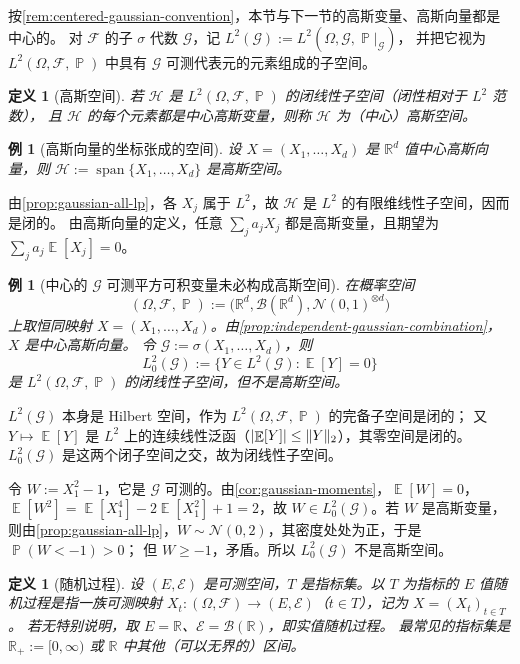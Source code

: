 \documentclass[UTF8,11pt,a4paper,oneside,fontset=fandol]{ctexrep}
\makeatletter
\numberwithin{equation}{section}
\theoremstyle{zhthm}
\newtheorem{definition}[theorem]{定义}
\newtheorem{example}[theorem]{例}
\renewenvironment{proof}[1][\proofname]{\par
  \pushQED{\qed}%
  \normalfont\topsep6\p@\@plus6\p@\relax
  \trivlist
  \item[\hskip\labelsep\bfseries#1\hspace{0.5em}]\ignorespaces
}{%
  \popQED\endtrivlist\@endpefalse
}
\renewcommand{\proofname}{证明}
\newcommand{\R}{\mathbb{R}}
\newcommand{\B}{\mathcal{B}}
\newcommand{\F}{\mathcal{F}}
\newcommand{\G}{\mathcal{G}}
\newcommand{\Hcal}{\mathcal{H}}
\DeclareMathOperator{\Prob}{\mathbb{P}}
\DeclareMathOperator{\E}{\mathbb{E}}
\DeclareMathOperator{\Span}{span}
\newcommand{\Normal}{\mathcal{N}}
\DeclarePairedDelimiter{\abs}{\lvert}{\rvert}
\DeclarePairedDelimiter{\norm}{\lVert}{\rVert}
\makeatother
\begin{document}
按\cref{rem:centered-gaussian-convention}，本节与下一节的高斯变量、高斯向量都是中心的。
对 $\F$ 的子 $\sigma$ 代数 $\G$，记 $L^2(\G):=L^2(\Omega,\G,\Prob|_{\G})$，
并把它视为 $L^2(\Omega,\F,\Prob)$ 中具有 $\G$ 可测代表元的元素组成的子空间。

\begin{definition}[高斯空间]
\label{def:gaussian-space}
若 $\Hcal$ 是 $L^2(\Omega,\F,\Prob)$ 的闭线性子空间（闭性相对于 $L^2$ 范数），
且 $\Hcal$ 的每个元素都是中心高斯变量，则称 $\Hcal$ 为（中心）高斯空间。
\end{definition}

\begin{example}[高斯向量的坐标张成的空间]
\label{ex:gaussian-coordinate-span}
设 $X=(X_1,\ldots,X_d)$ 是 $\R^d$ 值中心高斯向量，则 $\Hcal:=\Span\{X_1,\ldots,X_d\}$ 是高斯空间。
\end{example}

\begin{proof}
由\cref{prop:gaussian-all-lp}，各 $X_j$ 属于 $L^2$，故 $\Hcal$ 是 $L^2$ 的有限维线性子空间，因而是闭的。
由高斯向量的定义，任意 $\sum_ja_jX_j$ 都是高斯变量，且期望为 $\sum_ja_j\E[X_j]=0$。
\end{proof}

\begin{example}[中心的 $\G$ 可测平方可积变量未必构成高斯空间]
\label{ex:centered-measurable-not-gaussian-space}
在概率空间
\[
  (\Omega,\F,\Prob):=\bigl(\R^d,\B(\R^d),\Normal(0,1)^{\otimes d}\bigr)
\]
上取恒同映射 $X=(X_1,\ldots,X_d)$。由\cref{prop:independent-gaussian-combination}，$X$ 是中心高斯向量。
令 $\G:=\sigma(X_1,\ldots,X_d)$，则
\[
  L^2_0(\G):=\{Y\in L^2(\G):\E[Y]=0\}
\]
是 $L^2(\Omega,\F,\Prob)$ 的闭线性子空间，但不是高斯空间。
\end{example}

\begin{proof}
$L^2(\G)$ 本身是 Hilbert 空间，作为 $L^2(\Omega,\F,\Prob)$ 的完备子空间是闭的；
又 $Y\mapsto\E[Y]$ 是 $L^2$ 上的连续线性泛函（$\abs{\E[Y]}\le\norm{Y}_2$），其零空间是闭的。
$L^2_0(\G)$ 是这两个闭子空间之交，故为闭线性子空间。

令 $W:=X_1^2-1$，它是 $\G$ 可测的。由\cref{cor:gaussian-moments}，$\E[W]=0$，
$\E[W^2]=\E[X_1^4]-2\E[X_1^2]+1=2$，故 $W\in L^2_0(\G)$。若 $W$ 是高斯变量，
则由\cref{prop:gaussian-all-lp}，$W\sim\Normal(0,2)$，其密度处处为正，于是 $\Prob(W<-1)>0$；
但 $W\ge-1$，矛盾。所以 $L^2_0(\G)$ 不是高斯空间。
\end{proof}

\begin{definition}[随机过程]
\label{def:stochastic-process}
设 $(E,\mathcal{E})$ 是可测空间，$T$ 是指标集。以 $T$ 为指标的 $E$ 值随机过程是指一族可测映射
$X_t:(\Omega,\F)\to(E,\mathcal{E})$（$t\in T$），记为 $X=(X_t)_{t\in T}$。
若无特别说明，取 $E=\R$、$\mathcal{E}=\B(\R)$，即实值随机过程。
最常见的指标集是 $\R_+:=[0,\infty)$ 或 $\R$ 中其他（可以无界的）区间。
\end{definition}
\end{document}
